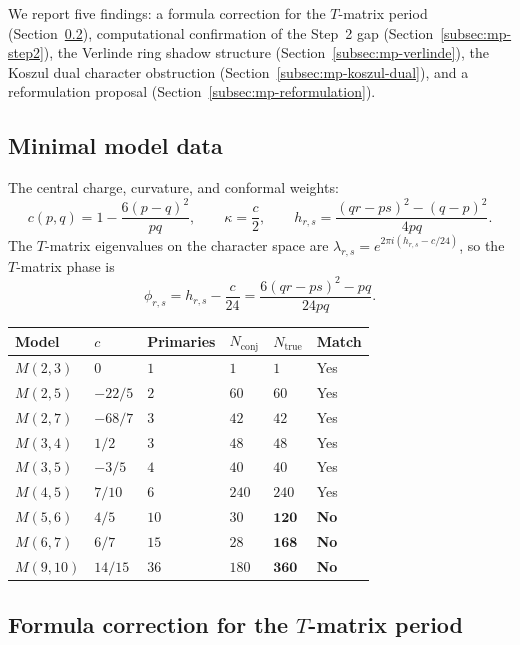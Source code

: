 \documentclass[11pt]{article}
\begin{document}
We report five findings: a formula correction for the $T$-matrix period
(Section~\ref{subsec:mp-formula-bug}), computational confirmation of the
Step~2 gap (Section~\ref{subsec:mp-step2}), the Verlinde ring shadow
structure (Section~\ref{subsec:mp-verlinde}), the Koszul dual character
obstruction (Section~\ref{subsec:mp-koszul-dual}), and a reformulation
proposal (Section~\ref{subsec:mp-reformulation}).

\subsection{Minimal model data}\label{subsec:mp-data}

The central charge, curvature, and conformal weights:
\[
c(p,q) = 1 - \frac{6(p-q)^2}{pq}, \qquad
\kappa = \frac{c}{2}, \qquad
h_{r,s} = \frac{(qr-ps)^2 - (q-p)^2}{4pq}.
\]
The $T$-matrix eigenvalues on the character space are
$\lambda_{r,s} = e^{2\pi i(h_{r,s} - c/24)}$,
so the $T$-matrix phase is
\begin{equation}\label{eq:mp-phase}
\phi_{r,s} = h_{r,s} - \frac{c}{24}
= \frac{6(qr-ps)^2 - pq}{24pq}.
\end{equation}

\begin{center}
\small
\begin{tabular}{llllll}
\toprule
Model & $c$ & Primaries & $N_{\mathrm{conj}}$ & $N_{\mathrm{true}}$ & Match \\
\midrule
$M(2,3)$ & $0$ & $1$ & $1$ & $1$ & Yes \\
$M(2,5)$ & $-22/5$ & $2$ & $60$ & $60$ & Yes \\
$M(2,7)$ & $-68/7$ & $3$ & $42$ & $42$ & Yes \\
$M(3,4)$ & $1/2$ & $3$ & $48$ & $48$ & Yes \\
$M(3,5)$ & $-3/5$ & $4$ & $40$ & $40$ & Yes \\
$M(4,5)$ & $7/10$ & $6$ & $240$ & $240$ & Yes \\
$M(5,6)$ & $4/5$ & $10$ & $30$ & $\mathbf{120}$ & \textbf{No} \\
$M(6,7)$ & $6/7$ & $15$ & $28$ & $\mathbf{168}$ & \textbf{No} \\
$M(9,10)$ & $14/15$ & $36$ & $180$ & $\mathbf{360}$ & \textbf{No} \\
\bottomrule
\end{tabular}
\end{center}

\subsection{Formula correction for the $T$-matrix period}
\label{subsec:mp-formula-bug}
\end{document}
